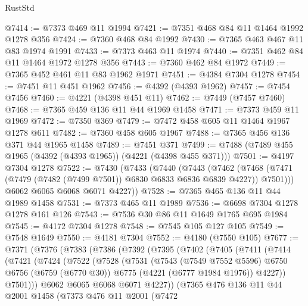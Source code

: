 \begin{lexlean}{RustStd}
\begin{coremodule}
@7414 := @7373 @469 @11 @1994
@7421 := @7351 @468 @84 @11 @1464 @1992 @1278 @356
@7424 := @7360 @468 @84 @1992
@7430 := @7365 @463 @467 @11 @83 @1974 @1991
@7433 := @7373 @463 @11 @1974
@7440 := @7351 @462 @84 @11 @1464 @1972 @1278 @356
@7443 := @7360 @462 @84 @1972
@7449 := @7365 @452 @461 @11 @83 @1962 @1971
@7451 := @4384 @7304 @1278
@7454 := @7451 @11 @451 @1962
@7456 := @4392 (@4393 @1962)
@7457 := @7454 @7456
@7460 := @4221 (@4398 @451 @11)
@7462 := @7449 (@7457 @7460)
@7468 := @7365 @459 @136 @11 @44 @1969 @1458
@7471 := @7373 @459 @11 @1969
@7472 := @7350 @369
@7479 := @7472 @458 @605 @11 @1464 @1967 @1278 @611
@7482 := @7360 @458 @605 @1967
@7488 := @7365 @456 @136 @371 @44 @1965 @1458
@7489 := @7451 @371
@7499 := @7488 (@7489 @455 @1965 (@4392 (@4393 @1965)) (@4221 (@4398 @455 @371)))
@7501 := @4197 @7304 @1278
@7522 := @7430
    (@7433
      (@7440
        (@7443
          (@7462 (@7468 (@7471 (@7479 (@7482 (@7499 @7501)) @6830 @6833 @6836 @6839 @4227)) @7501)))
        @6062
        @6065
        @6068
        @6071
        @4227))
@7528 := @7365 @465 @136 @11 @44 @1989 @1458
@7531 := @7373 @465 @11 @1989
@7536 := @6698 @7304 @1278 @1278 @161 @126
@7543 := @7536 @30 @86 @11 @1649 @1765 @695 @1984
@7545 := @4172 @7304 @1278
@7548 := @7545 @105 @127 @105
@7549 := @7548 @1649
@7550 := @4181 @7304
@7552 := @4180 (@7550 @105)
@7677 := @7371
    (@7376
      (@7383
        (@7386
          (@7392
            (@7395
              (@7402
                (@7405
                  (@7411
                    (@7414
                      (@7421
                        (@7424
                          (@7522
                            (@7528
                              (@7531
                                (@7543
                                  (@7549 @7552 @5596)
                                  @6750
                                  @6756
                                  (@6759 (@6770 @30))
                                  @6775
                                  (@4221 (@6777 @1984 @1976))
                                  @4227))
                              @7501)))
                        @6062
                        @6065
                        @6068
                        @6071
                        @4227))
                    (@7365
                      @476
                      @136
                      @11
                      @44
                      @2001
                      @1458
                      (@7373
                        @476
                        @11
                        @2001
                        (@7472

\end{coremodule}
\end{lexlean}
